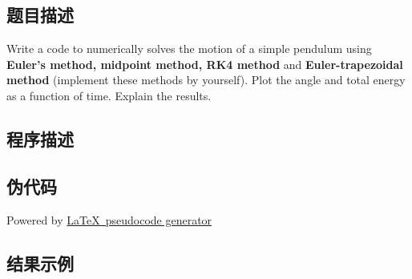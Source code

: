 \subsection{题目描述}
\noindent Write a code to numerically solves the motion of a simple pendulum using \textbf{Euler's method, midpoint method, RK4 method} and \textbf{Euler-trapezoidal method} (implement these methods by yourself). Plot the angle and total energy as a function of time. Explain the results.

\subsection{程序描述}

\subsection{伪代码}
Powered by \href{https://chatgpt.com/g/g-xJJAA2awf-latex-pseudocode-generator}{\LaTeX \ pseudocode generator}

\subsection{结果示例}

